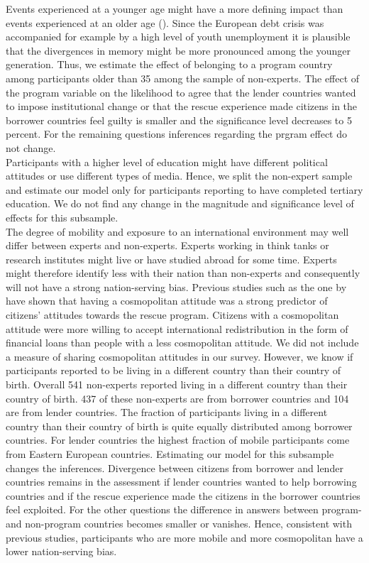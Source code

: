  Events experienced at a younger age might have a more defining impact than events experienced at an older age (\cite{baumeister}). Since the European debt crisis was accompanied for example by a high level of youth unemployment it is plausible that the divergences in memory might be more pronounced among the younger generation. Thus, we estimate the effect of belonging to a program country among participants older than 35 among the sample of non-experts.  The effect of the program variable on the likelihood to agree that the lender countries wanted to impose institutional change or that the rescue experience made citizens in the borrower countries feel guilty is smaller and the significance level decreases to 5 percent. For the remaining questions inferences regarding the prgram effect do not change. 
\\
Participants with a higher level of education might have different political attitudes or use different types of media. Hence, we split the non-expert sample and estimate our model only for participants reporting to have completed tertiary education. We do not find any change in the magnitude and significance level of effects for this subsample. 
\\
The degree of mobility and exposure to an international environment may well differ between experts and non-experts. Experts working in think tanks or research institutes might live or have studied abroad for some time. Experts might therefore identify less with their nation than non-experts and consequently will not have a strong nation-serving bias. Previous studies such as the one by \cite{bechtel} have shown that having a cosmopolitan attitude was a strong predictor of citizens' attitudes towards the rescue program. Citizens with a cosmopolitan attitude were more willing to accept international redistribution in the form of financial loans than people with a less cosmopolitan attitude. We did not include a measure of sharing cosmopolitan attitudes in our survey. However, we know if participants reported to be living in a different country than their country of birth. Overall 541 non-experts reported living in a different country than their country of birth. 437 of these non-experts are from borrower countries and 104 are from lender countries. The fraction of participants living in a different country than their country of birth is quite equally distributed among borrower countries. For lender countries the highest fraction of mobile participants come from Eastern European countries. Estimating our model for this subsample changes the inferences. Divergence between citizens from borrower and lender countries remains in the assessment if lender countries wanted to help borrowing countries and if the rescue experience made the citizens in the borrower countries feel exploited. For the other questions the difference in answers between program- and non-program countries becomes smaller or vanishes. Hence, consistent with previous studies, participants who are more mobile and more cosmopolitan have a lower nation-serving bias.  \\


